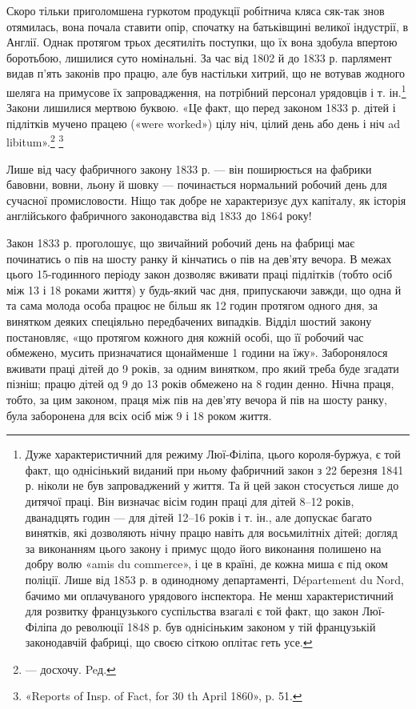 Скоро тільки приголомшена гуркотом продукції робітнича
кляса сяк-так знов отямилась, вона почала ставити опір, спочатку
на батьківщині великої індустрії, в Англії. Однак протягом
трьох десятиліть поступки, що їх вона здобула впертою боротьбою,
лишилися суто номінальні. За час від 1802 й до 1833 р.
парлямент видав п’ять законів про працю, але був настільки
хитрий, що не вотував жодного шеляга на примусове їх запровадження,
на потрібний персонал урядовців і т. ін.\footnote{
Дуже характеристичний для режиму Люї-Філіпа, цього короля-буржуа,
є той факт, що однісінький виданий при ньому фабричний
закон з 22 березня 1841 р. ніколи не був запроваджений у життя. Та й цей
закон стосується лише до дитячої праці. Він визначає вісім годин праці для
дітей 8--12 років, дванадцять годин — для дітей 12--16 років і
т. ін., але допускає багато винятків, які дозволяють нічну працю навіть
для восьмилітніх дітей; догляд за виконанням цього закону і примус
щодо його виконання полишено на добру волю «amis du commerce», і це
в країні, де кожна миша є під оком поліції. Лише від 1853 р. в одинодному
департаменті, Département du Nord, бачимо ми оплачуваного урядового
інспектора. Не менш характеристичний для розвитку французького
суспільства взагалі є той факт, що закон Люї-Філіпа до революції 1848 р.
був однісіньким законом у тій французькій законодавчій фабриці, що
своєю сіткою оплітає геть усе.
} Закони лишилися
мертвою буквою. «Це факт, що перед законом 1833 р. дітей
і підлітків мучено працею («were worked») цілу ніч, цілий день
або день і ніч ad libitum».\footnote*{
— досхочу. Peд.
} \footnote{
«Reports of Insp. of Fact, for 30 th April 1860», p. 51.
}

Лише від часу фабричного закону 1833 р. — він поширюється
на фабрики бавовни, вовни, льону й шовку — починається нормальний
робочий день для сучасної промисловости. Ніщо так
добре не характеризує дух капіталу, як історія англійського
фабричного законодавства від 1833 до 1864 року!

Закон 1833 р. проголошує, що звичайний робочий день на
фабриці має починатись о пів на шосту ранку й кінчатись о пів
на дев’яту вечора. В межах цього 15-годинного періоду закон
дозволяє вживати праці підлітків (тобто осіб між 13 і 18 роками
життя) у будь-який час дня, припускаючи завжди, що одна й
та сама молода особа працює не більш як 12 годин протягом одного
дня, за винятком деяких спеціяльно передбачених випадків. Відділ
шостий закону постановляє, «що протягом кожного дня кожній
особі, що її робочий час обмежено, мусить призначатися щонайменше
1 години на їжу». Заборонялося вживати праці дітей
до 9 років, за одним винятком, про який треба буде згадати пізніш;
працю дітей од 9 до 13 років обмежено на 8 годин денно.
Нічна праця, тобто, за цим законом, праця між пів на дев’яту
вечора й пів на шосту ранку, була заборонена для всіх осіб між
9 і 18 роком життя.


